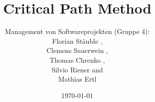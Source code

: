\documentclass[12pt,a4paper,titlepage,oneside,openany]{article}
\title{Critical Path Method}
\date{\today}
\author{
	Management von Softwareprojekten (Gruppe 4):\\
	Florian St\"auble \email{e0415588@student.tuwien.ac.at},\\
	Clemens Sauerwein \email{e0716649@student.tuwien.ac.at},\\
	Thomas Chrenko \email{thomas@chrenko.at},\\
	Silvio Riener \email{silvio@riener.ws} and\\
	Mathias Ertl \email{e0326788@student.tuwien.ac.at}
	}
\begin{document}
\maketitle
\begin{abstract}

\end{abstract}
\tableofcontents








\end{document}
